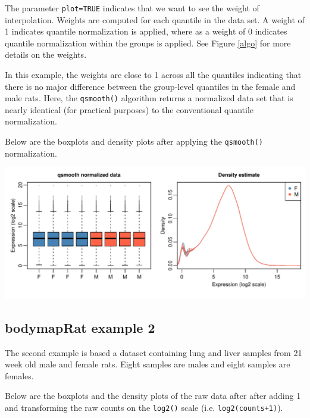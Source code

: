 \documentclass{article}\usepackage[]{graphicx}\usepackage[usenames,dvipsnames]{color}
\makeatletter
\def\maxwidth{ %
  \ifdim\Gin@nat@width>\linewidth
    \linewidth
  \else
    \Gin@nat@width
  \fi
}
\newenvironment{knitrout}{}{} %
\makeatother
\begin{document}
The parameter \texttt{plot=TRUE} indicates that we want to see the weight 
of interpolation. Weights are computed for each quantile in the data set.
A weight of 1 indicates quantile normalization is applied,
where as a weight of 0 indicates quantile normalization
within the groups is applied. See Figure \ref{algo} for more details on 
the weights.

In this example, the weights are close to 1 across all the quantiles 
indicating that there is no major difference between the group-level quantiles 
in the female and male rats. Here, the \texttt{qsmooth()} algorithm returns a 
normalized data set that is nearly identical (for practical purposes)
to the conventional quantile normalization. 

Below are the boxplots and density plots after applying the \texttt{qsmooth()} 
normalization.
\begin{knitrout}
\color{fgcolor}

{\centering \includegraphics[width=\maxwidth]{figure/norm_data1-1} 

}



\end{knitrout}

\subsection{bodymapRat example 2}

The second example is based a dataset containing lung and liver samples from 
21 week old male and female rats. Eight samples are males and eight 
samples are females.



Below are the boxplots and the density plots of the raw data after after adding 1 
and transforming the raw counts on the \texttt{log2()} scale 
(i.e. \texttt{log2(counts+1)}).
\end{document}
